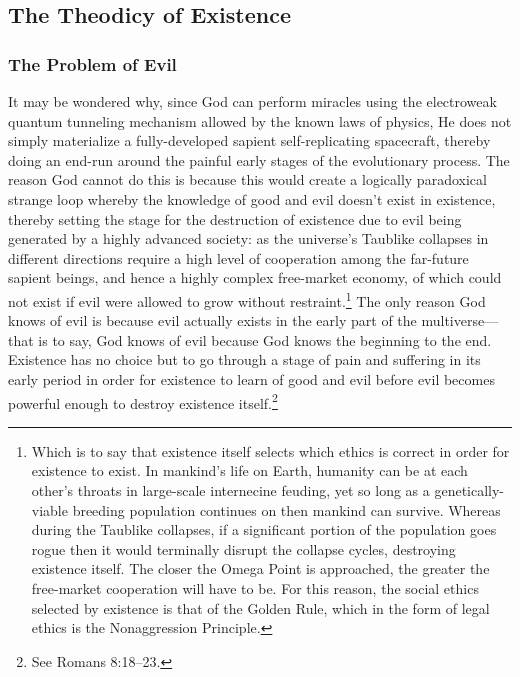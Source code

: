 \documentclass[letterpaper,12pt]{article}
\begin{document}
\subsection{The Theodicy of Existence}
\label{subsec:TheodicyOfExistence}

\subsubsection{The Problem of Evil}
\label{subsubsec:ProblemofEvil}

It may be wondered why, since God can perform \glspl{miracle} using the electroweak quantum tunneling mechanism allowed by the known laws of physics, He does not simply materialize a fully-developed sapient self-replicating spacecraft, thereby doing an end-run around the painful early stages of the evolutionary process. The reason God cannot do this is because this would create a logically paradoxical strange loop whereby the knowledge of good and evil doesn't exist in existence, thereby setting the stage for the destruction of existence due to evil being generated by a highly advanced society: as the universe's Taublike collapses in different directions require a high level of cooperation among the far-future sapient beings, and hence a highly complex free-market economy, of which could not exist if evil were allowed to grow without restraint.\footnote{\label{EthicsOfPhysics}Which is to say that existence itself selects which ethics is correct in order for existence to exist. In mankind's life on Earth, humanity can be at each other's throats in large-scale internecine feuding, yet so long as a genetically-viable breeding population continues on then mankind can survive. Whereas during the Taublike collapses, if a significant portion of the population goes rogue then it would terminally disrupt the collapse cycles, destroying existence itself. The closer the Omega Point is approached, the greater the free-market cooperation will have to be. For this reason, the social ethics selected by existence is that of the Golden Rule, which in the form of legal ethics is the Nonaggression Principle.} The only reason God knows of evil is because evil actually exists in the early part of the multiverse---that is to say, God knows of evil because God knows the beginning to the end. Existence has no choice but to go through a stage of pain and suffering in its early period in order for existence to learn of good and evil before evil becomes powerful enough to destroy existence itself.\footnote{See Romans 8:18--23.}
\end{document}
